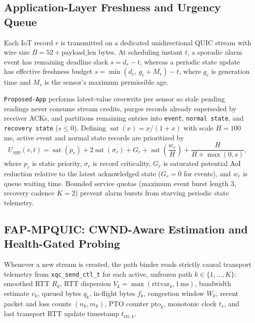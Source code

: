 \documentclass[preprint,12pt,number]{elsarticle}
\begin{document}
\subsection{Application-Layer Freshness and Urgency Queue}
Each IoT record $r$ is transmitted on a dedicated unidirectional QUIC stream with wire size $B = 52 + \text{payload\_len}$ bytes. At scheduling instant $t$, a sporadic alarm event has remaining deadline slack $s = d_r - t$, whereas a periodic state update has effective freshness budget $s = \min(d_r,\, g_r + M_r) - t$, where $g_r$ is generation time and $M_r$ is the sensor's maximum permissible age.

\texttt{Proposed-App} performs latest-value overwrite per sensor so stale pending readings never consume stream credits, purges records already superseded by receiver ACKs, and partitions remaining entries into \texttt{event}, \texttt{normal state}, and \texttt{recovery state} ($s \le 0$). Defining $\operatorname{sat}(x) = x/(1+x)$ with scale $H = 100$\,ms, active event and normal state records are prioritized by
\begin{equation}
\label{eq:app}
U_{\text{app}}(r, t) = \operatorname{sat}(p_r) + 2\operatorname{sat}(\sigma_r) + G_r + \operatorname{sat}\!\left(\frac{w_r}{H}\right) + \frac{H}{H + \max(0, s)},
\end{equation}
where $p_r$ is static priority, $\sigma_r$ is record criticality, $G_r$ is saturated potential AoI reduction relative to the latest acknowledged state ($G_r{=}0$ for events), and $w_r$ is queue waiting time. Bounded service quotas (maximum event burst length $3$, recovery cadence $K{=}2$) prevent alarm bursts from starving periodic state telemetry.

\subsection{FAP-MPQUIC: CWND-Aware Estimation and Health-Gated Probing}
Whenever a new stream is created, the path binder reads strictly causal transport telemetry from \texttt{xqc\_send\_ctl\_t} for each active, unfrozen path $k \in \{1,\dots,K\}$: smoothed RTT $R_k$, RTT dispersion $V_k = \max(\text{rttvar}_k, 1\,\text{ms})$, bandwidth estimate $v_k$, queued bytes $q_k$, in-flight bytes $f_k$, congestion window $W_k$, recent packet and loss counts $(n_k, m_k)$, PTO counter $\text{pto}_k$, monotonic clock $t_s$, and last transport RTT update timestamp $t_{\text{rtt},k}$.
\end{document}
